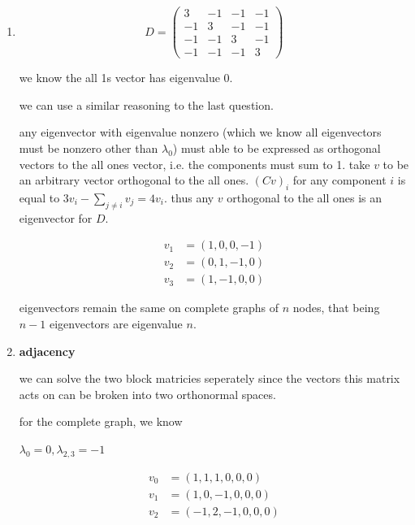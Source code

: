\documentclass{article}
\begin{document}
\begin{enumerate}
  \item 
  
  \begin{equation}
    D = \begin{pmatrix}
    3 & -1 & -1 & -1 \\
    -1 & 3 & -1 & -1 \\
    -1 & -1 & 3 & -1 \\
    -1 & -1 & -1 & 3
    \end{pmatrix}
  \end{equation}
  
  we know the all 1s vector has eigenvalue 0. 

  we can use a similar reasoning to the last question. 

  any eigenvector with eigenvalue nonzero (which we know all eigenvectors must be nonzero other than \(\lambda_0\)) must able to be expressed as orthogonal vectors to the all ones vector, i.e. the components must sum to 1. take \(v\) to be an arbitrary vector orthogonal to the all ones. \((Cv)_i\) for any component \(i\) is equal to \(3v_i - \sum_{j\neq i} v_j = 4v_i\). thus any \(v\) orthogonal to the all ones is an eigenvector for \(D\).

  \begin{equation}
    \begin{split}
      v_1 &= (1,0,0,-1)\\
      v_2 &= (0,1,-1,0)\\
      v_3 &= (1,-1,0,0)
    \end{split}
  \end{equation}

  eigenvectors remain the same on complete graphs of \(n\) nodes, that being \(n-1\) eigenvectors are eigenvalue \(n\).

  \item 

  \textbf{adjacency}

  we can solve the two block matricies seperately since the vectors this matrix acts on can be broken into two orthonormal spaces. 

  for the complete graph, we know 

  \(\lambda_0 = 0, \lambda_{2,3} = -1\)

  \begin{equation}
    \begin{split}
      v_0&=(1,1,1,0,0,0)\\
      v_1&= (1,0,-1,0,0,0)\\
      v_2&= (-1,2,-1,0,0,0)
    \end{split}
  \end{equation}


\end{enumerate}
\end{document}
